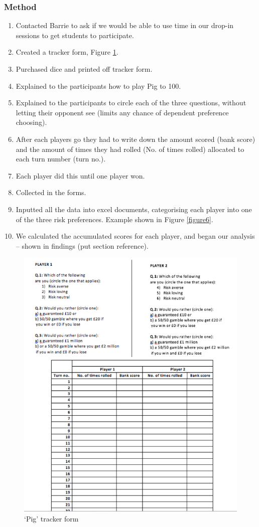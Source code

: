 \documentclass[a4paper,titlepage]{article}
\begin{document}
\subsubsection{Method}
\begin{enumerate}
\item Contacted Barrie to ask if we would be able to use time in our drop-in sessions to get students to participate.
\item Created a tracker form, Figure \ref{figure5}.
\item Purchased dice and printed off tracker form.
\item Explained to the participants how to play Pig to 100.
\item Explained to the participants to circle each of the three questions, without letting their opponent see (limits any chance of dependent preference choosing).
\item After each players go they had to write down the amount scored (bank score) and the amount of times they had rolled (No. of times rolled) allocated to each turn number (turn no.).
\item Each player did this until one player won.
\item Collected in the forms.
\item Inputted all the data into excel documents, categorising each player into one of the three risk preferences. Example shown in Figure \ref{figure6}.
\item We calculated the accumulated scores for each player, and began our analysis – shown in findings (put section reference).
\end{enumerate}
\begin{figure}
\center
\includegraphics[scale=1]{pig_tracker_form}
\caption{`Pig' tracker form\label{figure5}}
\end{figure}
\end{document}
